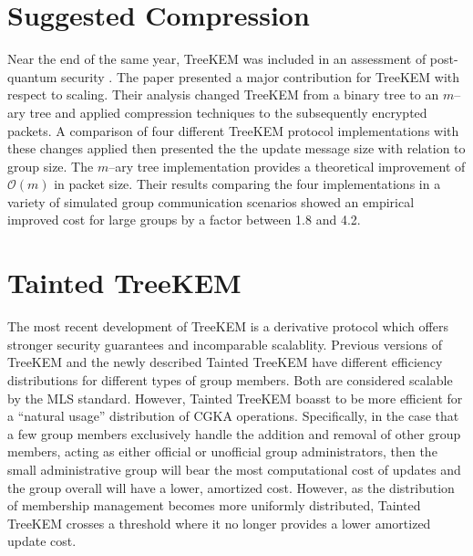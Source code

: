 \documentclass[12pt,twocolumn]{article}
\begin{document}
	\section*{Suggested Compression}
	
	Near the end of the same year, TreeKEM was included in an assessment of post-quantum security \cite{katsumata2020scalable}.
	The paper presented a major contribution for TreeKEM with respect to scaling.
	Their analysis changed TreeKEM from a binary tree to an $m$--ary tree and applied compression techniques to the subsequently encrypted packets.
	A comparison of four different TreeKEM protocol implementations with these changes applied then presented the the update message size with relation to group size.
	The $m$--ary tree implementation provides a theoretical improvement of $\mathcal{O}(m)$ in packet size.
	Their results comparing the four implementations in a variety of simulated group communication scenarios showed an empirical	improved cost for large groups by a factor between 1.8 and 4.2.
	
	
	\section*{Tainted TreeKEM}	
	
	The most recent development of TreeKEM is a derivative protocol which offers stronger security guarantees and incomparable scalablity.
	Previous versions of TreeKEM and the newly described Tainted TreeKEM \cite{klein2021keep} have different efficiency distributions for different types of group members.
	Both are considered scalable by the MLS standard.
	However, Tainted TreeKEM boasst to be more efficient for a ``natural usage'' distribution of CGKA operations.
	Specifically, in the case that a few group members exclusively handle the addition and removal of other group members, acting as either official or unofficial group administrators, then the small administrative group will bear the most computational cost of updates and the group overall will have a lower, amortized cost.
	However, as the distribution of membership management becomes more uniformly distributed, Tainted TreeKEM crosses a threshold where it no longer provides a lower amortized update cost.
	
\end{document}
